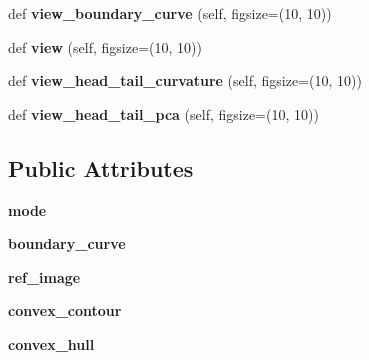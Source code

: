 \begin{DoxyCompactItemize}
def {\bfseries view\+\_\+boundary\+\_\+curve} (self, figsize=(10, 10))
\item 
\mbox{\label{class_boundary_1_1_boundary_a693461eda11af2565931243735e2cd35}} 
def {\bfseries view} (self, figsize=(10, 10))
\item 
\mbox{\label{class_boundary_1_1_boundary_a2efcb20fab22a7c77204222600f64f08}} 
def {\bfseries view\+\_\+head\+\_\+tail\+\_\+curvature} (self, figsize=(10, 10))
\item 
\mbox{\label{class_boundary_1_1_boundary_abf1045773eb4190868268b271ebe5a02}} 
def {\bfseries view\+\_\+head\+\_\+tail\+\_\+pca} (self, figsize=(10, 10))
\end{DoxyCompactItemize}
\subsection*{Public Attributes}
\begin{DoxyCompactItemize}
\item 
\mbox{\label{class_boundary_1_1_boundary_ab4484b99d15ae1b8b3514d396a51f1ad}} 
{\bfseries mode}
\item 
\mbox{\label{class_boundary_1_1_boundary_abd6ac376742f31321354e6da3dd3828c}} 
{\bfseries boundary\+\_\+curve}
\item 
\mbox{\label{class_boundary_1_1_boundary_a824be40dd3e0b0bc206e20535ce07fd0}} 
{\bfseries ref\+\_\+image}
\item 
\mbox{\label{class_boundary_1_1_boundary_a37e808f854c22642cb0f4f5fcf2e472b}} 
{\bfseries convex\+\_\+contour}
\item 
\mbox{\label{class_boundary_1_1_boundary_ad7c1532e0a338ffda18dc6f60596f10b}} 
{\bfseries convex\+\_\+hull}
\end{DoxyCompactItemize}
